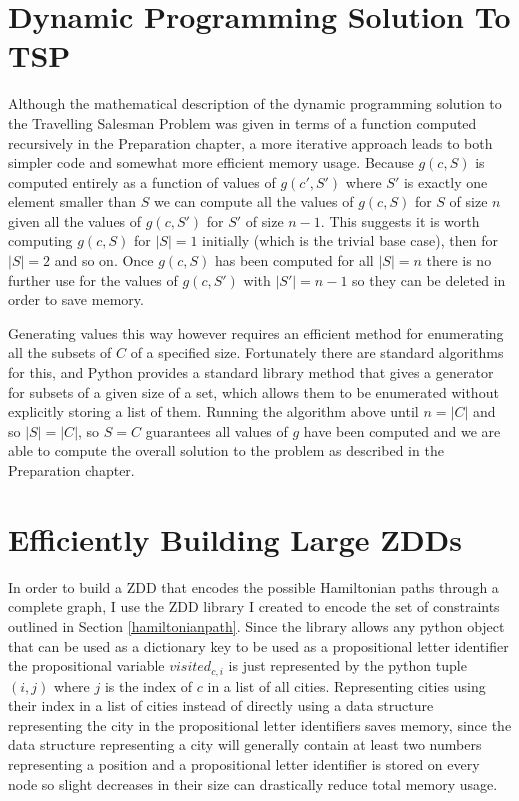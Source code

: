\documentclass[12pt,a4paper,twoside,openright]{report}
\begin{document}
\section{Dynamic Programming Solution To TSP}
Although the mathematical description of the dynamic programming solution to the Travelling Salesman Problem was given in terms of a function computed recursively in the Preparation chapter, a more iterative approach leads to both simpler code and somewhat more efficient memory usage. Because $g(c, S)$ is computed entirely as a function of values of $g(c', S')$ where $S'$ is exactly one element smaller than $S$ we can compute all the values of $g(c, S)$ for $S$ of size $n$ given all the values of $g(c,S')$ for $S'$ of size $n-1$. This suggests it is worth computing $g(c,S)$ for $|S|=1$ initially (which is the trivial base case), then for $|S|=2$ and so on. Once $g(c,S)$ has been computed for all $|S|=n$ there is no further use for the values of $g(c,S')$ with $|S'|=n-1$ so they can be deleted in order to save memory. 

Generating values this way however requires an efficient method for enumerating all the subsets of $C$ of a specified size. Fortunately there are standard algorithms for this, and Python provides a standard library method that gives a generator for subsets of a given size of a set, which allows them to be enumerated without explicitly storing a list of them. Running the algorithm above until $n=|C|$ and so $|S|=|C|$, so $S=C$ guarantees all values of $g$ have been computed and we are able to compute the overall solution to the problem as described in the Preparation chapter.

\section{Efficiently Building Large ZDDs}
In order to build a ZDD that encodes the possible Hamiltonian paths through a complete graph, I use the ZDD library I created to encode the set of constraints outlined in Section \ref{hamiltonianpath}. Since the library allows any python object that can be used as a dictionary key to be used as a propositional letter identifier the propositional variable $\mathit{visited}_{c,i}$ is just represented by the python tuple $(i, j)$ where $j$ is the index of $c$ in a list of all cities. Representing cities using their index in a list of cities instead of directly using a data structure representing the city in the propositional letter identifiers saves memory, since the data structure representing a city will generally contain at least two numbers representing a position and a propositional letter identifier is stored on every node so slight decreases in their size can drastically reduce total memory usage. 
\end{document}
